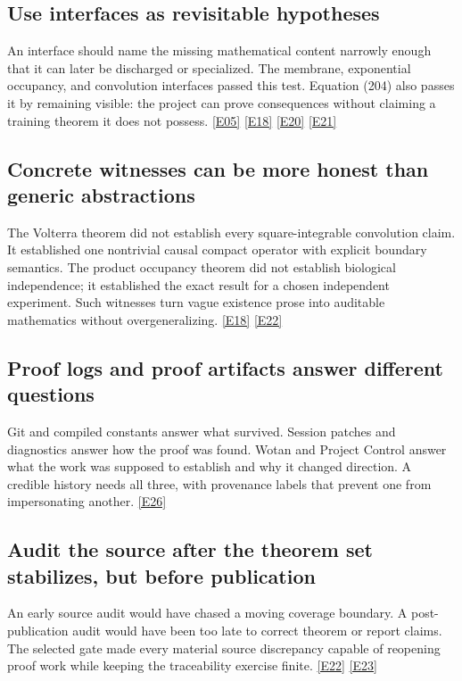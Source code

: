\documentclass[11pt,a4paper]{article}
\newcommand{\ev}[1]{%
  \hyperref[ev:#1]{\textcolor{ReportBlue}{\textsf{\scriptsize[#1]}}}}
\begin{document}
\subsection{Use interfaces as revisitable hypotheses}

An interface should name the missing mathematical content narrowly enough that it
can later be discharged or specialized. The membrane, exponential occupancy, and
convolution interfaces passed this test. Equation (204) also passes it by remaining
visible: the project can prove consequences without claiming a training theorem it
does not possess. \ev{E05}\ev{E18}\ev{E20}\ev{E21}

\subsection{Concrete witnesses can be more honest than generic abstractions}

The Volterra theorem did not establish every square-integrable convolution claim.
It established one nontrivial causal compact operator with explicit boundary
semantics. The product occupancy theorem did not establish biological independence;
it established the exact result for a chosen independent experiment. Such witnesses
turn vague existence prose into auditable mathematics without overgeneralizing.
\ev{E18}\ev{E22}

\subsection{Proof logs and proof artifacts answer different questions}

Git and compiled constants answer what survived. Session patches and diagnostics
answer how the proof was found. Wotan and Project Control answer what the work was
supposed to establish and why it changed direction. A credible history needs all
three, with provenance labels that prevent one from impersonating another. \ev{E26}

\subsection{Audit the source after the theorem set stabilizes, but before publication}

An early source audit would have chased a moving coverage boundary. A post-publication
audit would have been too late to correct theorem or report claims. The selected gate
made every material source discrepancy capable of reopening proof work while keeping
the traceability exercise finite. \ev{E22}\ev{E23}
\end{document}
